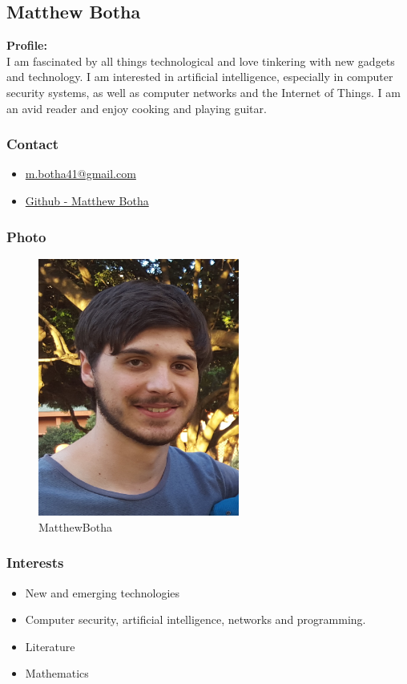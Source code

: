 \documentclass{article}
\begin{document}
	\newpage
	\subsection{Matthew Botha}
		\textbf{Profile:}\\
		I am fascinated by all things technological and love tinkering with new gadgets and technology. I am interested in artificial intelligence, especially in computer security systems, as well as computer networks and the Internet of Things. I am an avid reader and enjoy cooking and playing guitar.
		\subsubsection{Contact}
			\begin{itemize}
				\item \href{mailto:m.botha41@gmail.com}{m.botha41@gmail.com}
				\item \href{https://github.com/MatthewBotha}{Github - Matthew Botha}
			\end{itemize}
		\subsubsection{Photo}
		\begin{figure}[H]
			\centering
			\includegraphics[width=250px]{../Matt.jpg}
			\caption{MatthewBotha}
		\end{figure}
		\subsubsection{Interests}
		\begin{itemize}
			\item New and emerging technologies
			\item Computer security, artificial intelligence, networks and programming.
			\item Literature
			\item Mathematics
		\end{itemize}
		
\end{document}
